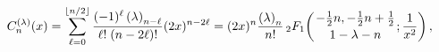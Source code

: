 \[\mathop{C^{(\lambda)}_{n}\/}\nolimits\!\left(x\right)=\sum_{\ell=0}^{\left%
\lfloor n/2\right\rfloor}\frac{(-1)^{\ell}\left(\lambda\right)_{n-\ell}}{\ell!%
\;(n-2\ell)!}(2x)^{n-2\ell}=(2x)^{n}\frac{\left(\lambda\right)_{n}}{n!}\mathop%
{{{}_{2}F_{1}}\/}\nolimits\!\left({-\tfrac{1}{2}n,-\tfrac{1}{2}n+\tfrac{1}{2}%
\atop 1-\lambda-n};\frac{1}{x^{2}}\right),\]